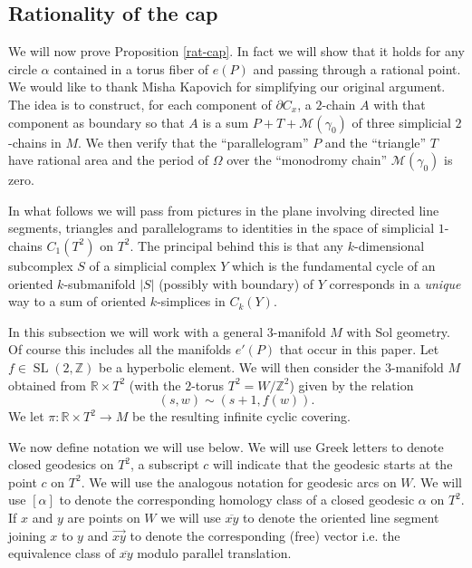 \documentclass[12pt,leqno]{amsart}
\numberwithin{equation}{section}
\theoremstyle{plain}
\theoremstyle{definition}
\theoremstyle{remark}
\newcommand{\R}{\mathbb{R}}
\newcommand{\Z}{\mathbb{Z}}
\newcommand{\SL}{\operatorname{SL}}
\begin{document}
\subsection{Rationality of the cap}\label{rat-cap11}
We will now prove Proposition \ref{rat-cap}.  In fact we will show that it holds for any circle $\alpha$ contained in a torus fiber of $e(P)$ and passing through a rational point. We would like to thank Misha Kapovich for simplifying  our original argument. The idea is to construct, for each component of $\partial C_x$, a $2$-chain $A$ with that component as boundary so that $A$ is a sum $P+ T  +\mathcal{M}(\gamma_0)$ of three simplicial $2$-chains in $M$. We then verify that the ``parallelogram'' $P$  and the ``triangle'' $T$  have rational area and the period of $\Omega$ over the ``monodromy chain'' $\mathcal{M}(\gamma_0)$ is zero. 

In what follows we will pass from pictures in the plane involving directed line segments, triangles and parallelograms to identities in the space of simplicial $1$-chains $C_1(T^2)$  on $T^2$. The principal behind this is that any $k$-dimensional subcomplex $S$ of a simplicial complex $Y$ which is the fundamental cycle of an oriented $k$-submanifold $|S|$ (possibly with boundary) of $Y$ corresponds in a {\it unique} way to a sum of oriented $k$-simplices in $C_k(Y)$.



In this subsection we will work with a general $3$-manifold $M$ with Sol geometry. Of course this includes all the manifolds $e'(P)$ that occur in this paper. Let $f \in \SL(2,\Z)$ be a hyperbolic element. We will then consider the $3$-manifold $M$ obtained from $ \R \times T^2$ (with the $2$-torus $T^2 = W/ \Z^2$) given by the relation
\begin{equation}\label{glueing}
(s,w) \sim (s+1,f(w)).  
\end{equation}
We let $\pi: \R\times T^2 \to M$ be the resulting infinite cyclic covering. 



We now define notation we will use below. We will use Greek letters to denote closed geodesics on $T^2$, a subscript $c$  will indicate that the geodesic starts at the point $c$ on $T^2$. We will use the analogous notation for geodesic arcs on $W$.  We will use $[\alpha]$ 
to denote the corresponding homology class of a closed geodesic $\alpha$ on $T^2$. 
If $x$ and $y$ are points on $W$ we will use $\overline{xy}$ to denote the oriented line segment joining $x$ to $y$ and $\overrightarrow{xy}$ to denote the corresponding (free) vector
i.e. the equivalence class of $\overline{xy}$ modulo parallel translation. 
   
\end{document}
